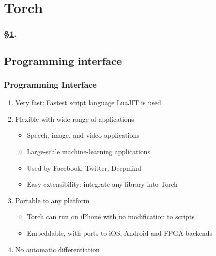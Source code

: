 
\section{Torch}\label{sec:Torch}


\frameinlbffalse

{

\begin{frame}[plain]
\frametitle{\S\ref{sec:Torch}. \insertsection}
\listofframes
\end{frame}
\addtocounter{framenumber}{-1} %

}

\frameinlbftrue

\subsection{Programming interface}

\begin{frame}
  \MyLogo
  \frametitle{Programming Interface}
  
\begin{enumerate}\setlength\itemsep{0.75em}
%
\item Very fast: Fastest script language LuaJIT is used
%
\item Flexible with wide range of applications
\begin{itemize}
\item Speech, image, and video applications
\item Large-scale machine-learning applications
\item Used by Facebook, Twitter, Deepmind
\item Easy extensibility: integrate any library into Torch
\end{itemize}
\item Portable to any platform
\begin{itemize}
\item Torch can run on iPhone with no modification to scripts
\item Embeddable, with ports to iOS, Android and FPGA backends
\end{itemize}
\item No automatic differentiation 
\end{enumerate}
\end{frame}

